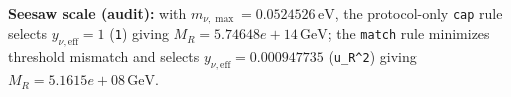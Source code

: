 \textbf{Seesaw scale (audit):} with $m_{\nu,\max}=0.0524526\,\mathrm{eV}$, the protocol-only \texttt{cap} rule selects $y_{\nu,\mathrm{eff}}=1$ (\texttt{1}) giving $M_R=5.74648e+14\,\mathrm{GeV}$; the \texttt{match} rule minimizes threshold mismatch and selects $y_{\nu,\mathrm{eff}}=0.000947735$ (\texttt{u\_R\string^2}) giving $M_R=5.1615e+08\,\mathrm{GeV}$.